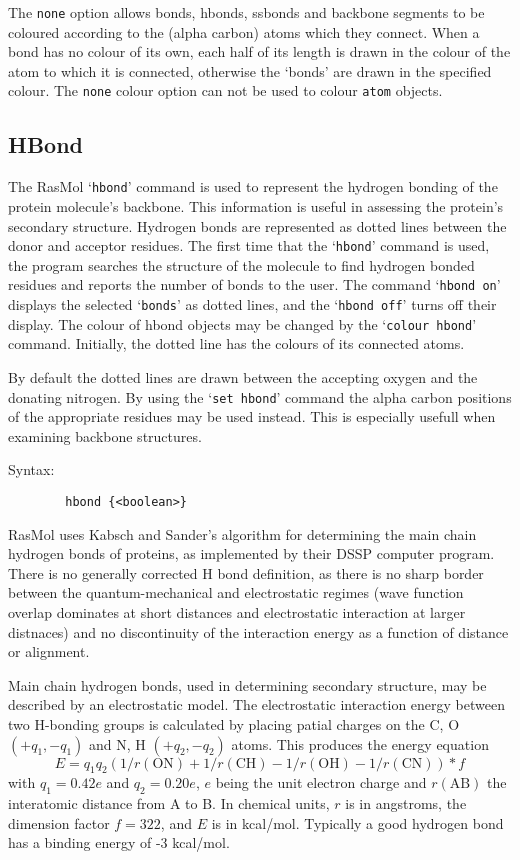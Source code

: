 The {\tt none} option allows bonds, hbonds, ssbonds and backbone segments 
to be coloured according to the (alpha carbon) atoms which they connect. 
When a bond has no colour of its own, each half of its length is drawn in 
the colour of the atom to which it is connected, otherwise the `bonds' are 
drawn in the specified colour. The {\tt none} colour option can not be
used to colour {\tt atom} objects.

\subsection{HBond}
\label{CHbond}

The RasMol `{\tt hbond}' command is used to represent the hydrogen bonding of 
the protein molecule's backbone. This information is useful in assessing
the protein's secondary structure. Hydrogen bonds are represented as
dotted lines between the donor and acceptor residues. The first time that 
the `{\tt hbond}' command is used, the program searches the structure of the 
molecule to find hydrogen bonded residues and reports the number of bonds 
to the user. The command `{\tt hbond on}' displays the selected `{\tt bonds}' 
as dotted lines, and the `{\tt hbond off}' turns off their display. The colour 
of hbond objects may be changed by the `{\tt colour hbond}' command. 
Initially, the dotted line has the colours of its connected atoms.

By default the dotted lines are drawn between the accepting oxygen and 
the donating nitrogen. By using the `{\tt set hbond}' command the alpha 
carbon positions of the appropriate residues may be used instead. This is 
especially usefull when examining backbone structures.

Syntax:
\begin{verbatim}
        hbond {<boolean>}
\end{verbatim}

RasMol uses Kabsch and Sander's algorithm for determining the main chain
hydrogen bonds of proteins, as implemented by their DSSP computer program.
There is no generally corrected H bond definition, as there is no sharp
border between the quantum-mechanical and electrostatic regimes (wave 
function overlap dominates at short distances and electrostatic interaction 
at larger distnaces) and no discontinuity of the interaction energy as a
function of distance or alignment.

Main chain hydrogen bonds, used in determining secondary structure, may
be described by an electrostatic model. The electrostatic interaction
energy between two H-bonding groups is calculated by placing patial charges
on the C, O $(+q_1,-q_1)$ and N, H $(+q_2,-q_2)$ atoms. This produces the
energy equation
\[ E = q_1 q_2 ( 1/r(\mbox{ON}) + 1/r(\mbox{CH}) 
               - 1/r(\mbox{OH}) - 1/r(\mbox{CN}) ) * f \]
with $q_1 = 0.42e$ and $q_2 = 0.20e$, $e$ being the unit electron charge
and $r(\mbox{AB})$ the interatomic distance from A to B. In chemical units,
$r$ is in angstroms, the dimension factor $f = 322$, and $E$ is in kcal/mol.
Typically a good hydrogen bond has a binding energy of -3 kcal/mol.

